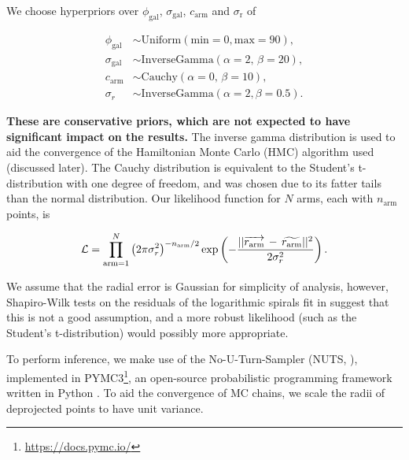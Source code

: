We choose hyperpriors over $\phi_\mathrm{gal}$, $\sigma_\mathrm{gal}$, $c_\mathrm{arm}$ and $\sigma_\mathrm{r}$ of

\begin{align}
  \phi_\mathrm{gal} &\sim \mathrm{Uniform}(\mathrm{min}=0, \mathrm{max}=90),\\
  \sigma_\mathrm{gal} &\sim \mathrm{InverseGamma}(\alpha=2,\,\beta=20),\\
  c_\mathrm{arm} &\sim \mathrm{Cauchy}(\alpha=0,\,\beta=10),\\
  \sigma_r &\sim \mathrm{InverseGamma}(\alpha=2, \beta=0.5).
\end{align}

\textbf{These are conservative priors, which are not expected to have significant impact on the results.} The inverse gamma distribution is used to aid the convergence of the Hamiltonian Monte Carlo (HMC) algorithm used (discussed later). The Cauchy distribution is equivalent to the Student's t-distribution with one degree of freedom, and was chosen due to its fatter tails than the normal distribution. Our likelihood function for $N$ arms, each with $n_\mathrm{arm}$ points, is

\begin{equation}
  \mathcal{L} = \prod_{\mathrm{arm}=1}^{N}\left(2\pi\sigma_r^2\right)^{-n_\mathrm{arm}/2}
  \exp\left(-\frac{||\overrightarrow{r_\mathrm{arm}}\,-\,\widetilde{r_\mathrm{arm}}||^2}{2\sigma_r^2}\right).
\end{equation}

We assume that the radial error is Gaussian for simplicity of analysis, however, Shapiro-Wilk tests on the residuals of the logarithmic spirals fit in \citet{2020arXiv200610450L} suggest that this is not a good assumption, and a more robust likelihood (such as the Student's t-distribution) would possibly more appropriate.

To perform inference, we make use of the No-U-Turn-Sampler (NUTS, \citealt{2011arXiv1111.4246H}), implemented in PYMC3\footnote{\url{https://docs.pymc.io/}}, an open-source probabilistic programming framework written in Python \citep{pymc3_paper}. To aid the convergence of MC chains, we scale the radii of deprojected points to have unit variance.
